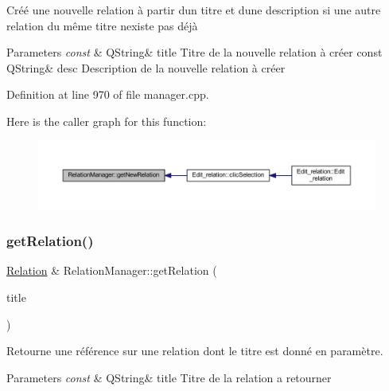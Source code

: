 Créé une nouvelle relation à partir d\textquotesingle{}un titre et d\textquotesingle{}une description si une autre relation du même titre n\textquotesingle{}existe pas déjà 


\begin{DoxyParams}{Parameters}
{\em const} & Q\+String\& title Titre de la nouvelle relation à créer const Q\+String\& desc Description de la nouvelle relation à créer \\
\hline
\end{DoxyParams}


Definition at line 970 of file manager.\+cpp.

Here is the caller graph for this function\+:\nopagebreak
\begin{figure}[H]
\begin{center}
\leavevmode
\includegraphics[width=350pt]{class_relation_manager_a1f9d556e0505105205e1fdb4905c4a80_icgraph}
\end{center}
\end{figure}
\mbox{\label{class_relation_manager_ad9ffbaba761149560d915f081d379ecc}} 
\subsubsection{\texorpdfstring{get\+Relation()}{getRelation()}}
{\footnotesize\ttfamily \hyperlink{class_relation}{Relation} \& Relation\+Manager\+::get\+Relation (\begin{DoxyParamCaption}\item[{const Q\+String \&}]{title }\end{DoxyParamCaption})}



Retourne une référence sur une relation dont le titre est donné en paramètre. 


\begin{DoxyParams}{Parameters}
{\em const} & Q\+String\& title Titre de la relation a retourner \\
\hline
\end{DoxyParams}


